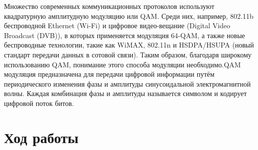 \documentclass[a4paper,12pt]{article}
\begin{document}
Множество современных коммуникационных протоколов используют квадратурную
амплитудную модуляцию или QAM. Среди них, например, 802.11b беспроводной Ethernet (Wi-Fi) и цифровое видео-вещание (Digital Video Broadcast (DVB)), в которых применяется модуляция 64-QAM, а также новые беспроводные технологии, такие как WiMAX, 802.11n и HSDPA/HSUPA (новый стандарт передачи данных в сотовой связи). Таким образом, благодаря широкому использованию QAM, понимание этого способа модуляции необходимо.QAM модуляция предназначена для передачи цифровой информации путём периодического изменения фазы и амплитуды синусоидальной электромагнитной волны. Каждая комбинация фазы и амплитуды называется символом и кодирует цифровой поток битов.


\newpage

\section{Ход работы}
\end{document}
